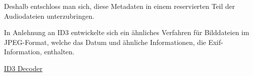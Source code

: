 Deshalb entschloss man sich, diese Metadaten in einem reservierten Teil der Audiodateien unterzubringen.

In Anlehnung an ID3 entwickelte sich ein ähnliches Verfahren für Bilddateien im JPEG-Format, welche das Datum und ähnliche Informationen, die Exif-Information, enthalten.

\href{https://github.com/mikkyang/id3-go}{ID3 Decoder}
